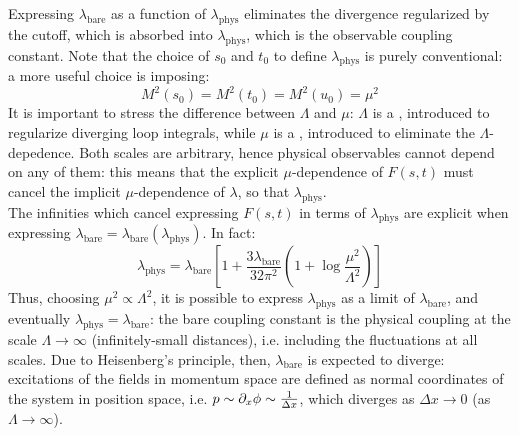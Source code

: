 Expressing $ \lambda_\text{bare} $ as a function of $ \lambda_\text{phys} $ eliminates the divergence regularized by the cutoff, which is absorbed into $ \lambda_\text{phys} $, which is the observable coupling constant. Note that the choice of $ s_0 $ and $ t_0 $ to define $ \lambda_\text{phys} $ is purely conventional: a more useful choice is imposing:
\begin{equation}
  M^2(s_0) = M^2(t_0) = M^2(u_0) = \mu^2
\end{equation}
It is important to stress the difference between $ \Lambda $ and $ \mu $: $ \Lambda $ is a , introduced to regularize diverging loop integrals, while $ \mu $ is a , introduced to eliminate the $ \Lambda $-depedence. Both scales are arbitrary, hence physical observables cannot depend on any of them: this means that the explicit $ \mu $-dependence of $ F(s,t) $ must cancel the implicit $ \mu $-dependence of $ \lambda $, so that $ \lambda_\text{phys} $. \\
The infinities which cancel expressing $ F(s,t) $ in terms of $ \lambda_\text{phys} $ are explicit when expressing $ \lambda_\text{bare} = \lambda_\text{bare}(\lambda_\text{phys}) $. In fact:
\begin{equation*}
  \lambda_\text{phys} = \lambda_\text{bare} \left[ 1 + \frac{3\lambda_\text{bare}}{32\pi^2} \left( 1 + \log \frac{\mu^2}{\Lambda^2} \right) \right]
\end{equation*}
Thus, choosing $ \mu^2 \propto \Lambda^2 $, it is possible to express $ \lambda_\text{phys} $ as a limit of $ \lambda_\text{bare} $, and eventually $ \lambda_\text{phys} = \lambda_\text{bare} $: the bare coupling constant is the physical coupling at the scale $ \Lambda \rightarrow \infty $ (infinitely-small distances), i.e. including the fluctuations at all scales. Due to Heisenberg's principle, then, $ \lambda_\text{bare} $ is expected to diverge: excitations of the fields in momentum space are defined as normal coordinates of the system in position space, i.e. $ p \sim \partial_x \phi \sim \frac{1}{\Delta x} $, which diverges as $ \Delta x \rightarrow 0 $ (as $ \Lambda \rightarrow \infty $).










